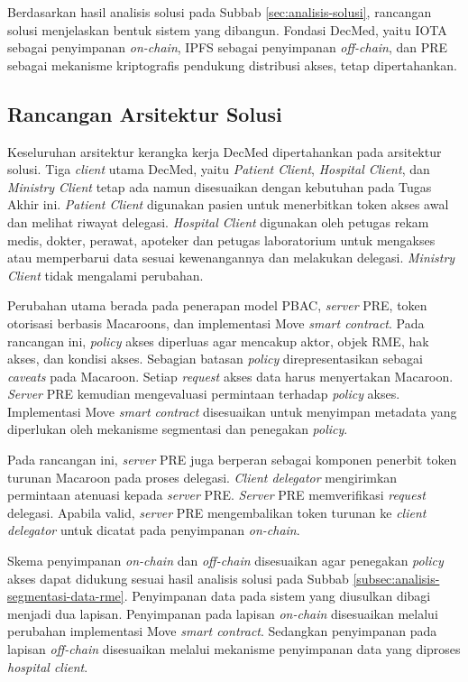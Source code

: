 \documentclass[bahasa, 12pt, a4paper, onecolumn, oneside, final]{report}
\begin{document}
Berdasarkan hasil analisis solusi pada Subbab \ref{sec:analisis-solusi}, rancangan solusi menjelaskan bentuk sistem yang dibangun. Fondasi DecMed, yaitu IOTA sebagai penyimpanan \textit{on-chain}, IPFS sebagai penyimpanan \textit{off-chain}, dan PRE sebagai mekanisme kriptografis pendukung distribusi akses, tetap dipertahankan.

\subsection{Rancangan Arsitektur Solusi}
\label{subsec:rancangan-arsitektur-solusi}

Keseluruhan arsitektur kerangka kerja DecMed dipertahankan pada arsitektur solusi. Tiga \textit{client} utama DecMed, yaitu \textit{Patient Client}, \textit{Hospital Client}, dan \textit{Ministry Client} tetap ada namun disesuaikan dengan kebutuhan pada Tugas Akhir ini. \textit{Patient Client} digunakan pasien untuk menerbitkan token akses awal dan melihat riwayat delegasi. \textit{Hospital Client} digunakan oleh petugas rekam medis, dokter, perawat, apoteker dan petugas laboratorium untuk mengakses atau memperbarui data sesuai kewenangannya dan melakukan delegasi. \textit{Ministry Client} tidak mengalami perubahan.

Perubahan utama berada pada penerapan model PBAC, \textit{server} PRE, token otorisasi berbasis Macaroons, dan implementasi Move \textit{smart contract}. Pada rancangan ini, \textit{policy} akses diperluas agar mencakup aktor, objek RME, hak akses, dan kondisi akses. Sebagian batasan \textit{policy} direpresentasikan sebagai \textit{caveats} pada Macaroon. Setiap \textit{request} akses data harus menyertakan Macaroon. \textit{Server} PRE kemudian mengevaluasi permintaan terhadap \textit{policy} akses. Implementasi Move \textit{smart contract} disesuaikan untuk menyimpan metadata yang diperlukan oleh mekanisme segmentasi dan penegakan \textit{policy}.

Pada rancangan ini, \textit{server} PRE juga berperan sebagai komponen penerbit token turunan Macaroon pada proses delegasi. \textit{Client delegator} mengirimkan permintaan atenuasi kepada \textit{server} PRE. \textit{Server} PRE memverifikasi \textit{request} delegasi. Apabila valid, \textit{server} PRE mengembalikan token turunan ke \textit{client delegator} untuk dicatat pada penyimpanan \textit{on-chain}.

Skema penyimpanan \textit{on-chain} dan \textit{off-chain} disesuaikan agar penegakan \textit{policy} akses dapat didukung sesuai hasil analisis solusi pada Subbab \ref{subsec:analisis-segmentasi-data-rme}. Penyimpanan data pada sistem yang diusulkan dibagi menjadi dua lapisan. Penyimpanan pada lapisan \textit{on-chain} disesuaikan melalui perubahan implementasi Move \textit{smart contract}. Sedangkan penyimpanan pada lapisan \textit{off-chain} disesuaikan melalui mekanisme penyimpanan data yang diproses \textit{hospital client}.
\end{document}
